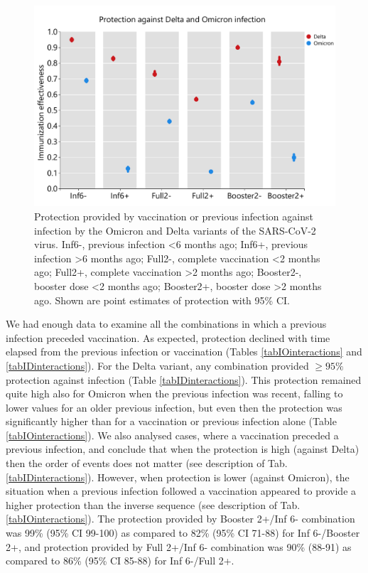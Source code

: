 \documentclass[9pt,twocolumn,twoside,lineno]{pnas-new}
\begin{document}
\begin{figure}[h]
\centering
\includegraphics[width=\linewidth]{fig2.pdf}
\caption{Protection provided by vaccination or previous infection against infection by the Omicron and Delta variants of the SARS-CoV-2 virus. Inf6-, previous infection <6 months ago; Inf6+, previous infection >6 months ago; Full2-, complete vaccination <2 months ago;  Full2+, complete vaccination >2 months ago; Booster2-, booster dose <2 months ago; Booster2+, booster dose >2 months ago. Shown are point estimates of protection with 95\% CI.}
\label{figIalone}
\end{figure}

We had enough data to examine all the combinations in which a previous infection preceded vaccination. As expected, protection declined with time elapsed from the previous infection or vaccination (Tables \ref{tabIOinteractions} and \ref{tabIDinteractions}). For the Delta variant, any combination provided $\geq 95\%$ protection against infection (Table \ref{tabIDinteractions}). This protection remained quite high also for Omicron when the previous infection was recent, falling to lower values for an older previous infection, but even then the protection was significantly higher than for a vaccination or previous infection alone (Table \ref{tabIOinteractions}). We also analysed cases, where a vaccination preceded a previous infection, and conclude that when the protection is high (against Delta) then the order of events does not matter (see description of Tab. \ref{tabIDinteractions}). However, when protection is lower (against Omicron), the situation when a previous infection followed a vaccination appeared to provide a higher protection than the inverse sequence (see description of Tab. \ref{tabIOinteractions}). The protection provided by Booster 2+/Inf 6- combination was 99\% (95\% CI 99-100) as compared to 82\% (95\% CI 71-88) for Inf 6-/Booster 2+, and protection provided by Full 2+/Inf 6- combination was 90\% (88-91) as compared to 86\% (95\% CI 85-88) for Inf 6-/Full 2+.
\end{document}
